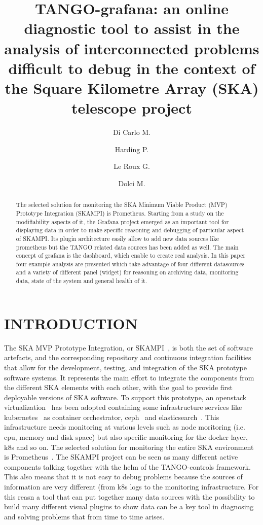 \documentclass[]{spie}  %
\title{TANGO-grafana: an online diagnostic tool to assist in the analysis of interconnected problems difficult to debug in the context of the Square Kilometre Array (SKA) telescope project}
\author[a]{Di Carlo M.}
\author[b]{Harding P.}
\author[c]{Le Roux G.}
\author[a]{Dolci M.}
\affil[a]{INAF Osservatorio Astronomico d'Abruzzo, Teramo, Italy}
\affil[b]{SKA Organisation, Macclesfield, UK}
\affil[c]{SKA South Africa, SA}
\begin{document}
 
\maketitle

\begin{abstract}
The selected solution for monitoring the SKA Minimum Viable Product (MVP) Prototype Integration (SKAMPI) is Prometheus. Starting from a study on the modifiability aspects of it, the Grafana project emerged as an important tool for displaying data in order to make specific reasoning and debugging of particular aspect of SKAMPI. Its plugin architecture easily allow to add new data sources like prometheus but the TANGO related data sources has been added as well. The main concept of grafana is the dashboard, which enable to create real analysis. In this paper four example analysis are presented which take advantage of four different datasources and a variety of different panel (widget) for reasoning on archiving data, monitoring data, state of the system and general health of it.
\end{abstract}


\section{INTRODUCTION} 
\label{sec:intro}  %

The SKA MVP Prototype Integration, or SKAMPI~\cite{SKAMPI}, is both the set of software artefacts, and the corresponding repository and continuous integration facilities that allow for the development, testing, and integration of the SKA prototype software systems. It represents the main effort to integrate the components from the different SKA elements with each other, with the goal to provide first deployable versions of SKA software. 
To support this prototype, an openstack virtualization~\cite{openstack} has been adopted containing some infrastructure services like kubernetes~\cite{kubernetes} as container orchestrator, ceph~\cite{ceph} and elasticsearch~\cite{elastic}. 
This infrastructure needs monitoring at various levels such as node moritoring (i.e. cpu, memory and disk space) but also specific monitoring for the docker layer, k8s and so on. The selected solution for monitoring the entire SKA environment is Prometheus~\cite{prometheus}.
The SKAMPI project can be seen as many different active components talking together with the helm of the TANGO-controls framework. This also means that it is not easy to debug problems because the sources of information are very different (from k8s logs to the monitoring infrastructure. For this reasn a tool that can put together many data sources with the possibility to build many different visual plugins to show data can be a key tool in diagnosing and solving problems that from time to time arises. 
\end{document}
